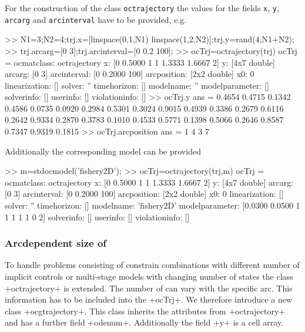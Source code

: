 For the construction of the class \lstinline+octrajectory+ the values for the fields \lstinline+x+, \lstinline+y+, \lstinline+arcarg+ and \lstinline+arcinterval+ have to be provided, e.g.
\begin{matlab}
>> N1=3;N2=4;trj.x=[linspace(0,1,N1) linspace(1,2,N2)];trj.y=rand(4,N1+N2);
>> trj.arcarg=[0 3];trj.arcinterval=[0 0.2 100];
>> ocTrj=octrajectory(trj)
ocTrj =
ocmatclass: octrajectory
                 x: [0 0.5000 1 1 1.3333 1.6667 2]
                 y: [4x7 double]
            arcarg: [0 3]
       arcinterval: [0 0.2000 100]
       arcposition: [2x2 double]
                x0: 0
     linearization: []
            solver: ''
       timehorizon: []
         modelname: ''
    modelparameter: []
        solverinfo: []
          userinfo: []
     violationinfo: []
>> ocTrj.y
ans =
    0.4654    0.4715    0.1342    0.4586    0.0735    0.0920    0.2984
    0.5301    0.3024    0.9015    0.4939    0.3386    0.2679    0.6116
    0.2642    0.9334    0.2870    0.3783    0.1010    0.4533    0.5771
    0.1398    0.5066    0.2646    0.8587    0.7347    0.9319    0.1815
>> ocTrj.arcposition
ans =
     1     4
     3     7
\end{matlab}
Additionally the corresponding model can be provided
\begin{matlab}
>> m=stdocmodel('fishery2D');
>> ocTrj=octrajectory(trj,m)
ocTrj =
ocmatclass: octrajectory
                 x: [0 0.5000 1 1 1.3333 1.6667 2]
                 y: [4x7 double]
            arcarg: [0 3]
       arcinterval: [0 0.2000 100]
       arcposition: [2x2 double]
                x0: 0
     linearization: []
            solver: ''
       timehorizon: []
         modelname: 'fishery2D'
    modelparameter: [0.0300 0.0500 1 1 1 1 1 0 2]
        solverinfo: []
          userinfo: []
     violationinfo: []
\end{matlab}
\subsubsection{Arcdependent size of \ODE}
To handle problems consisting of constrain combinations with different number of implicit controls or multi-stage models with changing number of states the class  \lsi+octrajectory+ is extended. The number of \ODEs{} can vary with the specific arc. This information has to be included into the \lsi+ocTrj+. We therefore introduce a new class \lsi+ocgtrajectory+. This class inherits the attributes from \lsi+octrajectory+ and has a further field \lsi+odenum+. Additionally the field \lsi+y+ is a cell array.

